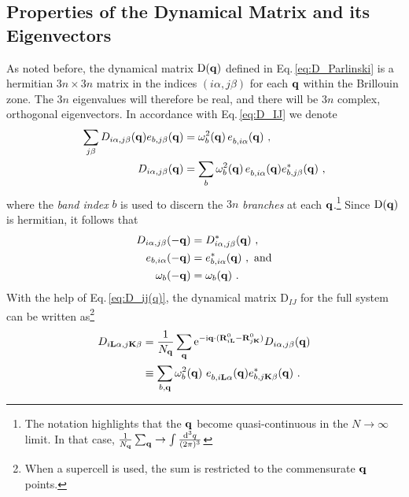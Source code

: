 \subsection{Properties of the Dynamical Matrix and its Eigenvectors}
\label{sec:dynmat.periodic}
As noted before, the dynamical matrix ${\rm D} ({\bf q})$ defined in Eq.\,\eqref{eq:D_Parlinski} is a hermitian $3n \times 3n$ matrix in the indices $(i \alpha, j \beta)$ for each ${\bf q}$ within the Brillouin zone. The $3n$ eigenvalues will therefore be real, and there will be $3n$ complex, orthogonal eigenvectors. In accordance with Eq.\,\eqref{eq:D_IJ} we denote
\begin{subequations}
\label{eq:D_ij(q)}
\begin{align}
	\sum_{j \beta} {D}_{i \alpha, j \beta} (\b q) e_{b, j \beta} (\b q)
		&= \omega^2_b (\b q) \, \fD e_{b, i \alpha} (\b q)~,
	\label{eq:D_ij(q)w} \\
	{D}_{i \alpha, j \beta} (\b q)
		&= \sum_b \omega^2_b (\b q) \, \fD e_{b, i \alpha} (\b q) e^\ast_{b, j \beta} (\b q)~,
\end{align}
\end{subequations}
where the \emph{band index} $b$ is used to discern the $3n$ \emph{branches} at each ${\bf q}$.\footnote{The notation highlights that the ${\bf q}$ become quasi-continuous in the $N \to \infty$ limit. In that case, $\frac{1}{N_{{\bf q}}} \sum_{{\bf q}} \to \int \frac{{\rm d}^3 q}{(2 \pi)^3}$} 
Since ${\rm D} ({\bf q})$ is hermitian, it follows that
\begin{align}
	D_{i \alpha, j \beta} (- {\bf q}) 
		& = D_{i \alpha, j \beta}^\ast ({\bf q})~, \\
	e_{b, i \alpha} (- {\bf q})
		&= e^\ast_{b, i \alpha} ({\bf q})~,\text{ and} \\
	\omega_b (- {\bf q})
		&= \omega_b ({\bf q})~.
\end{align}
With the help of Eq.\,\eqref{eq:D_ij(q)}, the dynamical matrix $\mathrm D_{IJ}$ for the full system can be written as\footnote{When a supercell is used, the sum is restricted to the commensurate ${\bf q}$ points.}
\begin{align}
	D_{i \b L \alpha, j \b K \beta}  
		& = \frac{1}{N_{\b q}} \sum_{\b q} {\rm e}^{- \im \b q \cdot (\b R_{i \b L}^0 - \b R_{j \b K}^0)} {D}_{i \alpha, j \beta} (\b q) \\
		& \equiv  \sum_{b, \b q} \omega_b^2 (\b q) ~ \fD e_{b, i \b L \alpha} (\b q) e^{\ast}_{b, j \b K \beta} (\b q)~.
	\label{eq:D_{iLa}}
\end{align}

